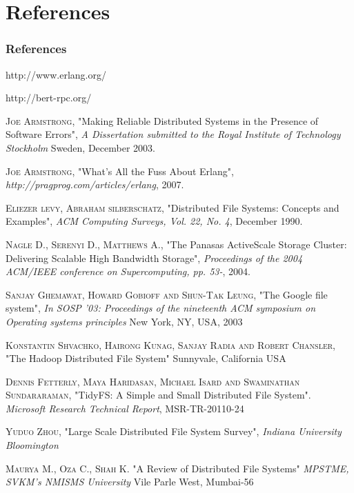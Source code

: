 \documentclass{beamer}
\makeatletter
\newcounter{multipleslide}
\newcommand{\multipleframe}
{
	\setcounter{multipleslide}{\value{framenumber}}
	\stepcounter{multipleslide}
	\patchcmd{\beamer@@tmpl@footline}
	{\insertframenumber}
	{\themultipleslide}
	{}
	{}
}
\makeatother
\begin{document}
\section{References}
\multipleframe
\begin{frame}[allowframebreaks]
\frametitle{References}
\begin{thebibliography}{99}
  http://www.erlang.org/

  http://bert-rpc.org/

  \textsc{Joe Armstrong},
  "Making Reliable Distributed Systems in the Presence of Software Errors",
  \emph{A Dissertation submitted to the Royal Institute of Technology Stockholm}
  Sweden, December 2003.

  \textsc{Joe Armstrong},
  "What's All the Fuss About Erlang",
  \emph{http://pragprog.com/articles/erlang},
  2007.

  \textsc{Eliezer levy, Abraham silberschatz},
  "Distributed File Systems: Concepts and Examples",
  \emph{ACM Computing Surveys, Vol. 22, No. 4},
  December 1990.

  \textsc{Nagle D., Serenyi D., Matthews A.},
  "The Panasas ActiveScale Storage Cluster: Delivering Scalable High Bandwidth Storage",
  \emph{Proceedings of the 2004 ACM/IEEE conference on Supercomputing, pp. 53-},
  2004.

  \textsc{Sanjay Ghemawat, Howard Gobioff and Shun-Tak Leung},
  "The Google file system",
  \emph{In SOSP '03: Proceedings of the nineteenth ACM symposium on Operating systems principles}
  New York, NY, USA, 2003

  \textsc{Konstantin Shvachko, Hairong Kunag, Sanjay Radia and Robert Chansler},
  "The Hadoop Distributed File System"
  Sunnyvale, California USA

  \textsc{Dennis Fetterly, Maya Haridasan, Michael Isard and Swaminathan Sundararaman},
  "TidyFS: A Simple and Small Distributed File System".
  \emph{Microsoft Research Technical Report},
  MSR-TR-20110-24

  \textsc{Yuduo Zhou},
  "Large Scale Distributed File System Survey",
  \emph{Indiana University Bloomington}

  \textsc{Maurya M., Oza C., Shah K.}
  "A Review of Distributed File Systems"
  \emph{MPSTME, SVKM's NMISMS University}
  Vile Parle West, Mumbai-56


\end{thebibliography}
\end{frame}
\end{document}
